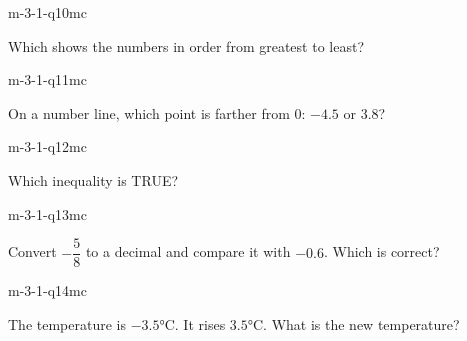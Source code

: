 \begin{practiceQuestion}{m-3-1-q10}{mc}
\begin{questionText}
Which shows the numbers in order from greatest to least?
\end{questionText}
\end{practiceQuestion}

\begin{practiceQuestion}{m-3-1-q11}{mc}
\begin{questionText}
On a number line, which point is farther from $0$: $-4.5$ or $3.8$?
\end{questionText}
\end{practiceQuestion}

\begin{practiceQuestion}{m-3-1-q12}{mc}
\begin{questionText}
Which inequality is TRUE?
\end{questionText}
\end{practiceQuestion}

\begin{practiceQuestion}{m-3-1-q13}{mc}
\begin{questionText}
Convert $-\dfrac{5}{8}$ to a decimal and compare it with $-0.6$. Which is correct?
\end{questionText}
\end{practiceQuestion}

\begin{practiceQuestion}{m-3-1-q14}{mc}
\begin{questionText}
The temperature is $-3.5°$C. It rises $3.5°$C. What is the new temperature?
\end{questionText}
\end{practiceQuestion}

